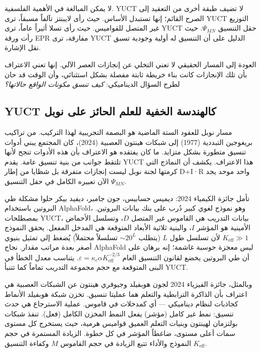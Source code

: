 \documentclass[12pt,a4paper]{article}
\begin{document}
	لا يمكن المبالغة في الأهمية الفلسفية. YUCT لا تضيف طبقة أخرى من التعقيد إلى الصرح القائم؛ إنها تستبدل الأساس. حيث رأى لايبنتز تآلفاً مسبقاً، ترى YUCT التوزيع غير المتصل للقواميس. حيث رأى تسلا أثيراً عاماً، ترى YUCT حقل التنسيق \(\Psi_{MN}\). حيث رأت ورقة EPR مفارقة، ترى YUCT الدليل على أن التنسيق له أولية وجودية تسبق نقل الإشارة.
	
	العودة إلى المسار الحقيقي لا تعني التخلي عن إنجازات العصر الآلي. إنها تعني الاعتراف بأن تلك الإنجازات كانت بناء خريطة ثابتة مفصلة بشكل استثنائي، وأن الوقت قد حان لطرح السؤال الديناميكي: \emph{كيف تنسق مكونات الواقع حالاتها؟}
	
	\subsection{YUCT كالهندسة الخفية للعلم الحائز على نوبل}
	
	مسار نوبل للعقود الستة الماضية هو البصمة التجريبية لهذا التركيب. من تراكيب بريغوجين التبددية (1977) إلى شبكات هينتون العصبية (2024)، كان المجتمع يبني أدوات تنسيق متطورة بشكل متزايد. ما كان يفتقده هو الاعتراف بأن هذه الأدوات تنجح لأنها تلتقط جوانب من بنية تنسيق عامة. يقدم YUCT هذا الاعتراف. يكشف أن النماذج التي كرمتها لجنة نوبل ليست إنجازات متفرقة بل شظايا من إطار D+I·R واحد موحد يجد الآن تعبيره الكامل في حقل التنسيق \(\Psi_{MN}\).
	
	تأمل جائزة الكيمياء 2024: ديميس حسابيس، جون جامبر، ديفيد بيكر حلوا مشكلة طي البروتين باستخدام AlphaFold، وهو نموذج لغوي كبير دُرب على بنك بيانات البروتين. بمصطلحات YUCT، بيانات التدريب هي القاموس غير المتصل \(D\)، وتسلسل الأحماض الأمينية هو المؤشر \(I\)، والبنية ثلاثية الأبعاد المتوقعة هي المدخل المفعل. يحقق النموذج \(K_{\mathrm{eff}} \gg 1\) لأن تسلسل طول \(L\) (يتطلب \(\sim 20^L\) تسلسلاً محتملاً) يُضغط إلى تمثيل بنيوي أصغر بعدة مراتب مقدار. نجاح AlphaFold ليس معجزة حوسبة غاشمة؛ إنه برهان على أن طي البروتين يخضع لقانون التنسيق العام \(\varepsilon = \kappa_c \alpha K_{\mathrm{eff}}^{-2/3}\). يتناسب معدل الخطأ في البنى المتوقعة مع حجم مجموعة التدريب تماماً كما تتنبأ YUCT.
	
	وبالمثل، جائزة الفيزياء 2024 لجون هوبفيلد وجيوفري هينتون عن الشبكات العصبية هي اعتراف بأن الذاكرة الترابطية والتعلم هما عمليتا تنسيق. تخزن شبكة هوبفيلد الأنماط كجاذبات لنظام ديناميكي — أي كمدخلات في قاموس. عملية الاسترجاع هي حدث تنسيق: نمط غير كامل (مؤشر) يفعل النمط المخزن الكامل (فعل). تنفذ شبكات بولتزمان لهينتون وبنيات التعلم العميق قواميس هرمية، حيث يستخرج كل مستوى سمات أعلى مستوى، ضاغطاً المؤشر في كل خطوة. الزيادة المستمرة في حجم النموذج والأداء تتبع الزيادة في حجم القاموس \(M\) وكفاءة التنسيق \(K_{\mathrm{eff}}\).
	
\end{document}
